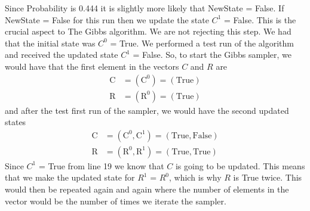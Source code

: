 \documentclass[12pt,twoside]{report}   %
\begin{document}
Since Probability is 0.444 it is slightly more likely that NewState = False. If \newline NewState = False for this run then we update the state $C^1$ = False. This is the crucial aspect to The Gibbs algorithm. We are not rejecting this step. We had that the initial state was $C^0$ = True. We performed a test run of the algorithm and received the updated state $C^1$ = False. So, to start the Gibbs sampler, we would have that the first element in the vectors $C$ and $R$ are
\begin{align*}
\text{C} &= (\text{C}^0) = (\text{True})\\
\text{R} &= (\text{R}^0) = (\text{True})
\end{align*}
and after the test first run of the sampler, we would have the second updated states
\begin{align*}
\text{C} &= (\text{C}^0, \text{C}^1) = (\text{True}, \text{False})\\
\text{R} &= (\text{R}^0, \text{R}^1) = (\text{True}, \text{True})
\end{align*}
Since $C^1$ = True from line 19 we know that $C$ is going to be updated. This means that we make the updated state for $R^1$ = $R^0$, which is why $R$ is True twice. This would then be repeated again and again where the number of elements in the vector would be the number of times we iterate the sampler.
\end{document}
